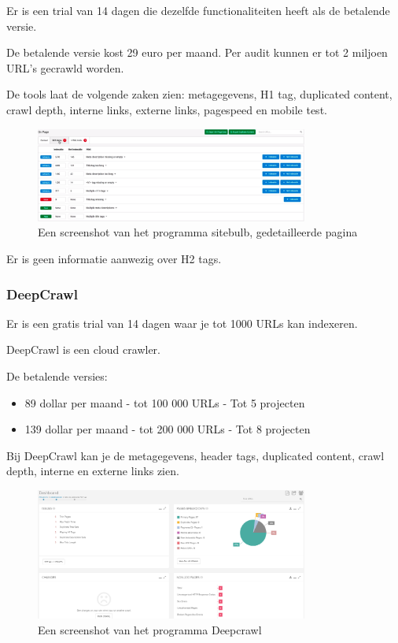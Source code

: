 Er is een trial van 14 dagen die dezelfde functionaliteiten heeft als de betalende versie. 

De betalende versie kost 29 euro per maand. Per audit kunnen er tot 2 miljoen URL's gecrawld worden. 

De tools laat de volgende zaken zien: metagegevens, H1 tag, duplicated content, crawl depth, interne links, externe links, pagespeed en mobile test. 

\begin{figure}[h!]
\centering
\includegraphics[width=0.8\textwidth]{img/sitebulb2.PNG}
\caption{Een screenshot van het programma sitebulb, gedetailleerde pagina
\autocite{sitebulb}}
\end{figure}

Er is geen informatie aanwezig over H2 tags.

\subsubsection{DeepCrawl}
\label{ch: DeepCrawl}
Er is een gratis trial van 14 dagen waar je tot 1000 URLs kan indexeren.

DeepCrawl is een cloud crawler. 

De betalende versies: 
\begin{itemize}
\item 89 dollar per maand - tot 100 000 URLs - Tot 5 projecten
\item 139 dollar per maand - tot 200 000 URLs - Tot 8 projecten
\end{itemize}

Bij DeepCrawl kan je de metagegevens, header tags, duplicated content, crawl depth, interne en externe links zien. 

\begin{figure}[h!]
\centering
\includegraphics[width=0.8\textwidth]{img/deepcrawl.PNG}
\caption{Een screenshot van het programma Deepcrawl
\autocite{deepcrawl}}
\end{figure}

